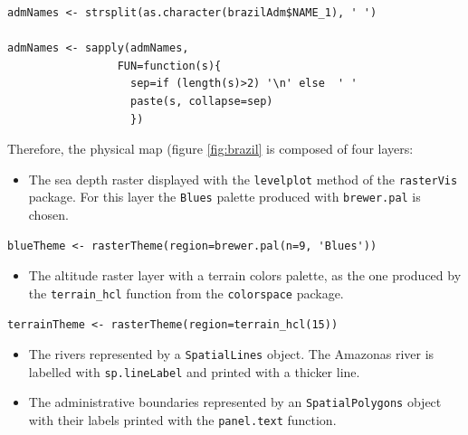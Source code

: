 \lstset{language=R}
\begin{lstlisting}
admNames <- strsplit(as.character(brazilAdm$NAME_1), ' ')

admNames <- sapply(admNames,
                 FUN=function(s){
                   sep=if (length(s)>2) '\n' else  ' '
                   paste(s, collapse=sep)
                   })
\end{lstlisting}


  
  
  
  


Therefore, the physical map (figure \ref{fig:brazil} is composed
of four layers: 

\begin{itemize}
\item The sea depth raster displayed with the \texttt{levelplot} method of
  the \texttt{rasterVis} package. For this layer the \texttt{Blues} palette
  produced with \texttt{brewer.pal} is chosen.
\end{itemize}


\lstset{language=R}
\begin{lstlisting}
blueTheme <- rasterTheme(region=brewer.pal(n=9, 'Blues'))
\end{lstlisting}

\begin{itemize}
\item The altitude raster layer with a terrain colors palette, as the
  one produced by the \texttt{terrain\_hcl} function from the \texttt{colorspace}
  package.
\end{itemize}


\lstset{language=R}
\begin{lstlisting}
terrainTheme <- rasterTheme(region=terrain_hcl(15))
\end{lstlisting}

\begin{itemize}
\item The rivers represented by a \texttt{SpatialLines} object. The Amazonas
  river is labelled with \texttt{sp.lineLabel} and printed with a thicker
  line.
\item The administrative boundaries represented by an \texttt{SpatialPolygons}
  object with their labels printed with the \texttt{panel.text} function.
\end{itemize}


